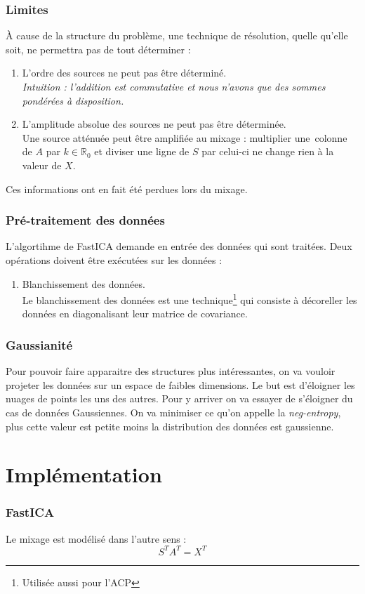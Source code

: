 \documentclass[compress]{beamer}
\newcommand{\esR}{\mathbb{R}}
\begin{document}
\begin{frame}
	\frametitle{Limites}
	À cause de la structure du problème, une technique de résolution,
	quelle qu'elle soit, ne permettra pas de tout déterminer :
	\pause
	\begin{enumerate}
	\item L'ordre des sources ne peut pas être déterminé.
	\pause
		\\\textit{Intuition : l'addition est commutative et nous n'avons que
			des sommes pondérées à disposition.}
	\pause
	\item L'amplitude absolue des sources ne peut pas être déterminée.
	\pause
		\\Une source atténuée peut être amplifiée au mixage :
			multiplier une~colonne de $A$ par $k\in\esR_0$ et
			diviser une ligne de $S$ par celui-ci ne change rien à
			la valeur de $X$.
	\pause
	\end{enumerate}

	Ces informations ont en fait été perdues lors du mixage.
\end{frame}
\begin{frame}
	\frametitle{Pré-traitement des données}
	L'algortihme de FastICA demande en entrée des données qui sont traitées.
	Deux opérations doivent être exécutées sur les données :
	\pause
	\begin{enumerate}
	\item Blanchissement des données.
		\pause
			\\Le blanchissement des données est une technique\footnote{Utilisée aussi pour l'ACP} qui consiste à décoreller les données en diagonalisant leur matrice de covariance.
	\pause
	
	\end{enumerate}
\end{frame}
\begin{frame}
	\frametitle{Gaussianité}
	Pour pouvoir faire apparaitre des structures plus intéressantes, on va vouloir projeter les données sur un espace de faibles dimensions. Le but est d'éloigner les nuages de points les uns des autres. Pour y arriver on va essayer de s'éloigner du cas de données Gaussiennes. On va minimiser ce qu'on appelle la \textit{neg-entropy}, plus cette valeur est petite moins la distribution des données est gaussienne.
\end{frame}


\section{Implémentation}
\begin{frame}
	\frametitle{FastICA}
	Le mixage est modélisé dans l'autre sens :
	\[
		S^TA^T=X^T
	\]
\end{frame}
\end{document}
